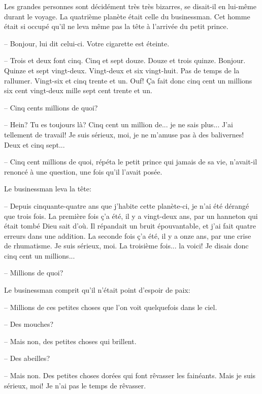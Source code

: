 \documentclass[a4paper]{report}
\begin{document}
Les grandes personnes sont décidément très très bizarres, se disait-il en lui-même durant le voyage.
\parachapter[XIII]{} %
La quatrième planète était celle du businessman. Cet homme était si occupé qu'il ne leva même pas la tête à l'arrivée du petit prince.

-- Bonjour, lui dit celui-ci. Votre cigarette est éteinte.

-- Trois et deux font cinq. Cinq et sept douze. Douze et trois quinze. Bonjour. Quinze et sept vingt-deux. Vingt-deux et six vingt-huit. Pas de temps de la rallumer. Vingt-six et cinq trente et un. Ouf! Ça fait donc cinq cent un millions six cent vingt-deux mille sept cent trente et un.


-- Cinq cents millions de quoi?

-- Hein? Tu es toujours là? Cinq cent un million de... je ne sais plus... J'ai tellement de travail! Je suis sérieux, moi, je ne m'amuse pas à des balivernes! Deux et cinq sept...

-- Cinq cent millions de quoi, répéta le petit prince qui jamais de sa vie, n'avait-il renoncé à une question, une fois qu'il l'avait posée.

Le businessman leva la tête:

-- Depuis cinquante-quatre ans que j'habite cette planète-ci, je n'ai été dérangé que trois fois. La première fois ç'a été, il y a vingt-deux ans, par un hanneton qui était tombé Dieu sait d'où. Il répandait un bruit épouvantable, et j'ai fait quatre erreurs dans une addition. La seconde fois ç'a été, il y a onze ans, par une crise de rhumatisme. Je suis sérieux, moi. La troisième fois... la voici! Je disais donc cinq cent un millions...

-- Millions de quoi?

Le businessman comprit qu'il n'était point d'espoir de paix:

-- Millions de ces petites choses que l'on voit quelquefois dans le ciel.

-- Des mouches?

-- Mais non, des petites choses qui brillent.

-- Des abeilles?

-- Mais non. Des petites choses dorées qui font rêvasser les fainéants. Mais je suis sérieux, moi! Je n'ai pas le temps de rêvasser.
\end{document}

